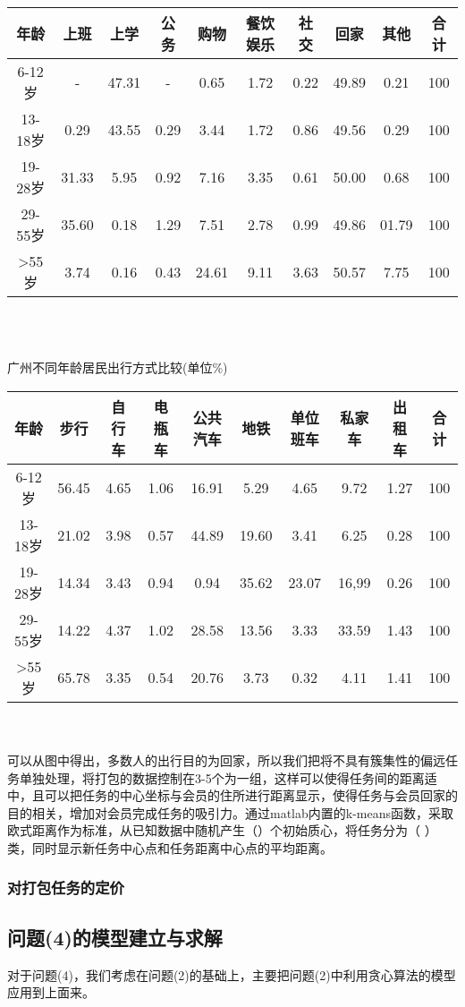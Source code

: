 \documentclass{ctexart}
\begin{document}
\begin{tabular}{|cccccccccc|}

\hline
年龄 &上班&上学&公务&购物&餐饮娱乐&社交&回家&其他&合计\\
\hline
6-12岁 &-&47.31&-&0.65&1.72&0.22&49.89&0.21&100\\
\hline
13-18岁 &0.29&43.55&0.29&3.44&1.72&0.86&49.56&0.29&100\\
\hline
19-28岁 &31.33&5.95&0.92&7.16&3.35&0.61&50.00&0.68&100\\
\hline
29-55岁 &35.60&0.18&1.29&7.51&2.78&0.99&49.86&01.79&100\\
\hline
>55岁 &3.74&0.16&0.43&24.61&9.11&3.63&50.57&7.75&100\\
\hline
\end{tabular}
\\
\\
\centerline{广州不同年龄居民出行方式比较(单位\%)}

\begin{tabular}{|cccccccccc|}

\hline
年龄 &步行&自行车&电瓶车&公共汽车&地铁&单位班车&私家车&出租车&合计\\
\hline
6-12岁 &56.45&4.65&1.06&16.91&5.29&4.65&9.72&1.27&100\\
\hline
13-18岁 &21.02&3.98&0.57&44.89&19.60&3.41&6.25&0.28&100\\
\hline
19-28岁 &14.34&3.43&0.94&0.94&35.62&23.07&16,99&0.26&100\\
\hline
29-55岁 &14.22&4.37&1.02&28.58&13.56&3.33&33.59&1.43&100\\
\hline
>55岁 &65.78&3.35&0.54&20.76&3.73&0.32&4.11&1.41&100\\
\hline
\end{tabular}
\\
\\
可以从图中得出，多数人的出行目的为回家，所以我们把将不具有簇集性的偏远任务单独处理，将打包的数据控制在3-5个为一组，这样可以使得任务间的距离适中，且可以把任务的中心坐标与会员的住所进行距离显示，使得任务与会员回家的目的相关，增加对会员完成任务的吸引力。通过matlab内置的k-means函数，采取欧式距离作为标准，从已知数据中随机产生（）个初始质心，将任务分为（ ）类，同时显示新任务中心点和任务距离中心点的平均距离。
\subsubsection{对打包任务的定价}
\subsection{问题(4)的模型建立与求解}
对于问题(4)，我们考虑在问题(2)的基础上，主要把问题(2)中利用贪心算法的模型应用到上面来。
\end{document}
